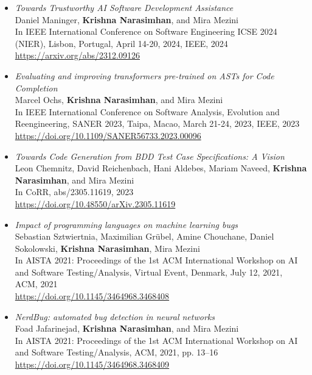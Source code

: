\begin{itemize}
\begin{itemize}

    \item \emph{Towards Trustworthy AI Software Development Assistance} \\
    Daniel Maninger, \textbf{Krishna Narasimhan}, and Mira Mezini \\
    In IEEE International Conference on Software Engineering ICSE 2024 (NIER), Lisbon, Portugal, April 14-20, 2024, IEEE, 2024 \\
    \url{https://arxiv.org/abs/2312.09126}


    \item \emph{Evaluating and improving transformers pre-trained on ASTs for Code Completion} \\
Marcel Ochs, \textbf{Krishna Narasimhan}, and Mira Mezini \\
In IEEE International Conference on Software Analysis, Evolution and Reengineering, SANER 2023, Taipa, Macao, March 21-24, 2023, IEEE, 2023 \\
\url{https://doi.org/10.1109/SANER56733.2023.00096}

\item \emph{Towards Code Generation from BDD Test Case Specifications: A Vision} \\
Leon Chemnitz, David Reichenbach, Hani Aldebes, Mariam Naveed, \textbf{Krishna Narasimhan}, and Mira Mezini \\
In CoRR, abs/2305.11619, 2023 \\
\url{https://doi.org/10.48550/arXiv.2305.11619}

\item \emph{Impact of programming languages on machine learning bugs} \\
Sebastian Sztwiertnia, Maximilian Grübel, Amine Chouchane, Daniel Sokolowski, \textbf{Krishna Narasimhan}, Mira Mezini \\
In AISTA 2021: Proceedings of the 1st ACM International Workshop on AI and Software Testing/Analysis, Virtual Event, Denmark, July 12, 2021, ACM, 2021 \\
\url{https://doi.org/10.1145/3464968.3468408}

\item \emph{NerdBug: automated bug detection in neural networks} \\
Foad Jafarinejad, \textbf{Krishna Narasimhan}, and Mira Mezini \\
In AISTA 2021: Proceedings of the 1st ACM International Workshop on AI and Software Testing/Analysis, ACM, 2021, pp. 13--16 \\
\url{https://doi.org/10.1145/3464968.3468409}




\end{itemize}
\end{itemize}
